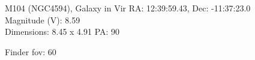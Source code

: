 \begin{block}{M104 (NGC4594), Galaxy in Vir}
    RA: 12:39:59.43, Dec: -11:37:23.0 \\ 
    Magnitude (V): 8.59 \\ 
    Dimensions: 8.45 x 4.91 PA: 90 

    Finder fov: 60 
\end{block}